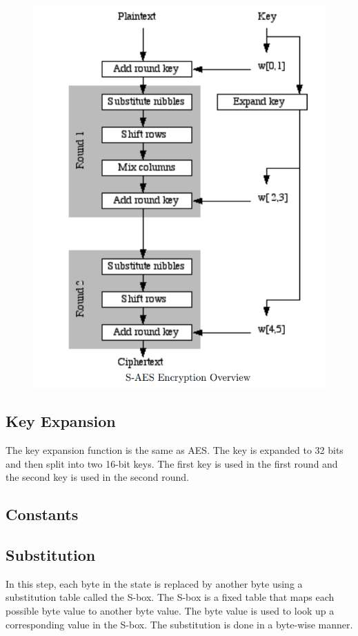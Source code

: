 \documentclass[11pt]{article}
\begin{document}
\begin{figure}[H]
	\centering
	\includegraphics[scale=0.5]{saes.png}
	\caption{}
\end{figure}

\subsection{Key Expansion}
The key expansion function is the same as AES. The key is expanded to 32 bits and
then split into two 16-bit keys. The first key is used in the first round and the second key is used in the second round.
\subsection{Constants}

\subsection{Substitution}
In this step, each byte in the state is replaced by another byte using a substitution table called the S-box. The S-box is a fixed table that maps each possible byte value to another byte value. The byte value is used to look up a corresponding value in the S-box. The substitution is done in a byte-wise manner.
\end{document}
